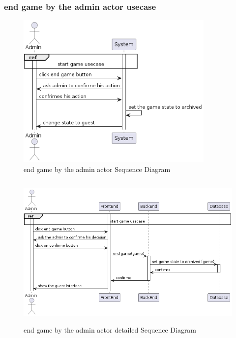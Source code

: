 \documentclass{article}
\begin{document}
\subsubsection{end game by the admin actor usecase}
\begin{figure}[H]
	\centering
	\includegraphics[height=3in]{../thesis_tex/assets/diagrams/admin_end_game_SD.png}
	\caption{end game by the admin actor Sequence Diagram}
\end{figure}

\begin{figure}[H]
	\centering
	\includegraphics[height=3in]{../thesis_tex/assets/diagrams/admin_end_game_detailedSD.png}
	\caption{end game by the admin actor detailed Sequence Diagram}
\end{figure}
\end{document}

